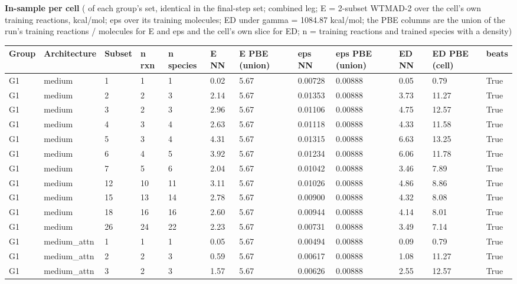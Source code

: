 \documentclass[10pt,a4paper]{article}
\begin{document}
\textbf{In-sample per cell} ( of each group's  set, identical in the final-step set; combined leg; E = 2-subset WTMAD-2 over the cell's own training reactions, kcal/mol; eps over its training molecules; ED under gamma = 1084.87 kcal/mol; the PBE columns are the union of the run's training reactions / molecules for E and eps and the cell's own slice for ED; n = training reactions and trained species with a density)

\begin{landscape}
\begin{tiny}
\begin{longtable}{llllllllllll}
\toprule Group & Architecture & Subset & n rxn & n species & E NN & E PBE (union) & eps NN & eps PBE (union) & ED NN & ED PBE (cell) & beats \\ \midrule \endhead
G1 & medium & 1 & 1 & 1 & 0.02 & 5.67 & 0.00728 & 0.00888 & 0.05 & 0.79 & True \\
G1 & medium & 2 & 2 & 3 & 2.14 & 5.67 & 0.01353 & 0.00888 & 3.73 & 11.27 & True \\
G1 & medium & 3 & 2 & 3 & 2.96 & 5.67 & 0.01106 & 0.00888 & 4.75 & 12.57 & True \\
G1 & medium & 4 & 3 & 4 & 2.63 & 5.67 & 0.01118 & 0.00888 & 4.33 & 11.58 & True \\
G1 & medium & 5 & 3 & 4 & 4.31 & 5.67 & 0.01315 & 0.00888 & 6.63 & 13.25 & True \\
G1 & medium & 6 & 4 & 5 & 3.92 & 5.67 & 0.01234 & 0.00888 & 6.06 & 11.78 & True \\
G1 & medium & 7 & 5 & 6 & 2.04 & 5.67 & 0.01042 & 0.00888 & 3.46 & 7.89 & True \\
G1 & medium & 12 & 10 & 11 & 3.11 & 5.67 & 0.01026 & 0.00888 & 4.86 & 8.86 & True \\
G1 & medium & 15 & 13 & 14 & 2.78 & 5.67 & 0.00900 & 0.00888 & 4.32 & 8.08 & True \\
G1 & medium & 18 & 16 & 16 & 2.60 & 5.67 & 0.00944 & 0.00888 & 4.14 & 8.01 & True \\
G1 & medium & 26 & 24 & 22 & 2.23 & 5.67 & 0.00731 & 0.00888 & 3.49 & 7.14 & True \\
G1 & medium\_attn & 1 & 1 & 1 & 0.05 & 5.67 & 0.00494 & 0.00888 & 0.09 & 0.79 & True \\
G1 & medium\_attn & 2 & 2 & 3 & 0.59 & 5.67 & 0.00617 & 0.00888 & 1.08 & 11.27 & True \\
G1 & medium\_attn & 3 & 2 & 3 & 1.57 & 5.67 & 0.00626 & 0.00888 & 2.55 & 12.57 & True \\

\end{longtable}
\end{tiny}
\end{landscape}
\end{document}
